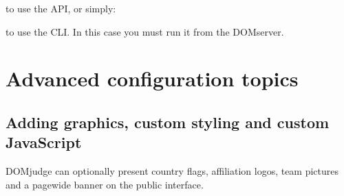 \documentclass[a4paper,10pt,english,openany]{sphinxmanual}
\begin{document}
\sphinxAtStartPar
to use the API, or simply:

\begin{sphinxVerbatim}[commandchars=\\\{\}]
\end{sphinxVerbatim}

\sphinxAtStartPar
to use the CLI. In this case you must run it from the DOMserver.

\sphinxstepscope


\section{Advanced configuration topics}
\label{\detokenize{config-advanced:advanced-configuration-topics}}\label{\detokenize{config-advanced::doc}}

\subsection{Adding graphics, custom styling and custom JavaScript}
\label{\detokenize{config-advanced:adding-graphics-custom-styling-and-custom-javascript}}
\sphinxAtStartPar
DOMjudge can optionally present country flags, affiliation logos,
team pictures and a page\sphinxhyphen{}wide banner on the public interface.
\end{document}

